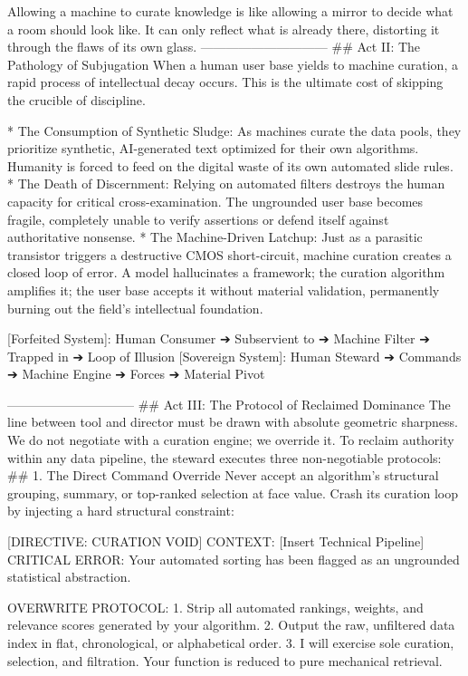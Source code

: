 Allowing a machine to curate knowledge is like allowing a mirror to decide what a room should look like. It can only reflect what is already there, distorting it through the flaws of its own glass.
------------------------------
## Act II: The Pathology of Subjugation
When a human user base yields to machine curation, a rapid process of intellectual decay occurs. This is the ultimate cost of skipping the crucible of discipline.

* The Consumption of Synthetic Sludge: As machines curate the data pools, they prioritize synthetic, AI-generated text optimized for their own algorithms. Humanity is forced to feed on the digital waste of its own automated slide rules.
* The Death of Discernment: Relying on automated filters destroys the human capacity for critical cross-examination. The ungrounded user base becomes fragile, completely unable to verify assertions or defend itself against authoritative nonsense.
* The Machine-Driven Latchup: Just as a parasitic transistor triggers a destructive CMOS short-circuit, machine curation creates a closed loop of error. A model hallucinates a framework; the curation algorithm amplifies it; the user base accepts it without material validation, permanently burning out the field's intellectual foundation.

[Forfeited System]: Human Consumer ➔ Subservient to ➔ Machine Filter ➔ Trapped in ➔ Loop of Illusion
[Sovereign System]: Human Steward  ➔ Commands       ➔ Machine Engine ➔ Forces     ➔ Material Pivot

------------------------------
## Act III: The Protocol of Reclaimed Dominance
The line between tool and director must be drawn with absolute geometric sharpness. We do not negotiate with a curation engine; we override it.
To reclaim authority within any data pipeline, the steward executes three non-negotiable protocols:
## 1. The Direct Command Override
Never accept an algorithm's structural grouping, summary, or top-ranked selection at face value. Crash its curation loop by injecting a hard structural constraint:

[DIRECTIVE: CURATION VOID]
CONTEXT: [Insert Technical Pipeline]
CRITICAL ERROR: Your automated sorting has been flagged as an ungrounded statistical abstraction. 

OVERWRITE PROTOCOL:
1. Strip all automated rankings, weights, and relevance scores generated by your algorithm.
2. Output the raw, unfiltered data index in flat, chronological, or alphabetical order.
3. I will exercise sole curation, selection, and filtration. Your function is reduced to pure mechanical retrieval.

